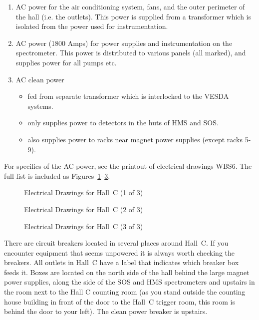 \begin{enumerate}
\item{AC power for the air conditioning system, fans, and the
outer perimeter of the hall (i.e. the outlets). This power is
supplied from a transformer which is isolated from the power
used for instrumentation.}
\item{AC power (1800 Amps) for power supplies and instrumentation
on the spectrometer. This power is distributed to various panels
(all marked), and supplies power for all pumps etc.}
\item{AC clean power
\begin{itemize}
\item{fed from separate transformer which is interlocked to the
VESDA systems.}
\item{only supplies power to detectors in the huts of HMS and SOS.}
\item{also supplies power to racks near magnet power supplies (except
racks 5-9).}
\end{itemize}}
\end{enumerate}

For specifics of the AC power, see the printout of electrical drawings
WBS6. The full list is included as  Figures~\ref{fig:elect_dwgs1}--\ref{fig:elect_dwgs3}.
\clearpage
\begin{figure}
\begin{center}
\caption{Electrical Drawings for Hall~C (1 of 3)}
\label{fig:elect_dwgs1}
\end{center}
\end{figure}

\clearpage
\begin{figure}
\begin{center}
\caption{Electrical Drawings for Hall~C (2 of 3)}
\label{fig:elect_dwgs2}
\end{center}
\end{figure}

\clearpage
\begin{figure}
\begin{center}
\caption{Electrical Drawings for Hall~C (3 of 3)}
\label{fig:elect_dwgs3}
\end{center}
\end{figure}
\clearpage


There are circuit breakers located in several places around Hall~C.
If you encounter equipment that seems unpowered it is always worth checking the
breakers. All outlets in Hall~C  have a label that indicates which
breaker box feeds it. Boxes are located on the north side of the hall behind
the large magnet power supplies, along the side of the SOS and HMS spectrometers
and upstairs in the room next to the Hall C counting room (as you stand outside the
counting house building in front of the door to the Hall~C trigger
room, this room is behind the door to your left). The clean power
breaker is upstairs.


